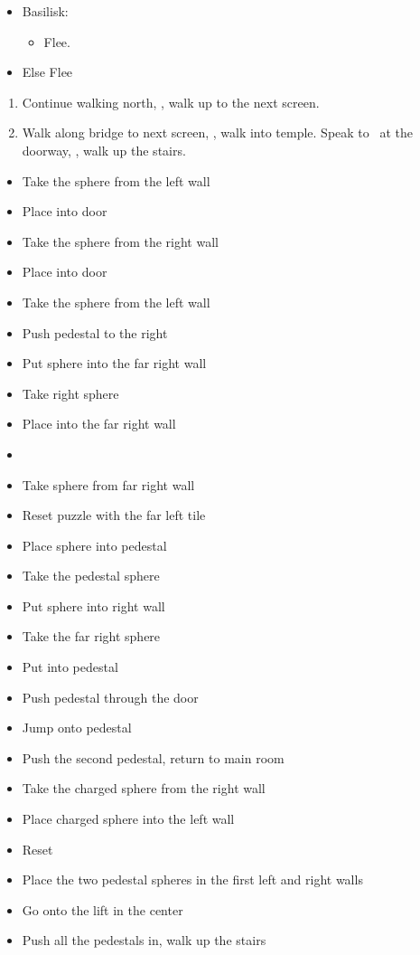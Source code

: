 \begin{encounters}
	\begin{itemize}
		\item Basilisk:
		      \begin{itemize}
			      \kimahrif Lancet Basilisk, learn \textbf{Stone Breath}
			      \item Flee.
		      \end{itemize}
		\item Else Flee
	\end{itemize}
\end{encounters}
\begin{enumerate}[resume]
	\item Continue walking north, \sd, walk up to the next screen.
	\item Walk along bridge to next screen, \sd, walk into temple. Speak to \auron\ at the doorway, \sd, walk up the stairs.
\end{enumerate}
\vfill
\begin{trial}
	\begin{itemize}
		\item Take the sphere from the left wall
		\item Place into door
		\item Take the sphere from the right wall
		\item Place into door
		\item Take the sphere from the left wall
		\item Push pedestal to the right
		\item Put sphere into the far right wall
		\item Take right sphere
		\item Place into the far right wall
		\item \cs
		\item Take sphere from far right wall
		\item Reset puzzle with the far left tile
		\item Place sphere into pedestal
		\item Take the pedestal sphere
		\item Put sphere into right wall
		\item Take the far right sphere
		\item Put into pedestal
		\item Push pedestal through the door
		\item Jump onto pedestal
		\item Push the second pedestal, return to main room
		\item Take the charged sphere from the right wall
		\item Place charged sphere into the left wall
		\item Reset
		\item Place the two pedestal spheres in the first left and right walls
		\item Go onto the lift in the center
		\item Push all the pedestals in, walk up the stairs
	\end{itemize}
\end{trial}
